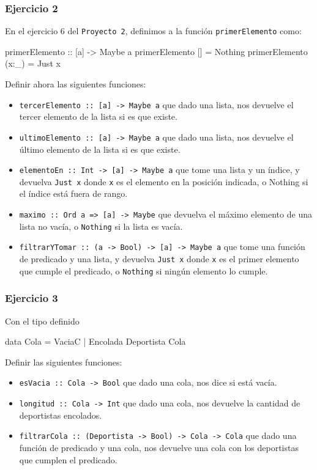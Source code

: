 \documentclass{article}
\begin{document}
\subsubsection{Ejercicio 2}
En el ejercicio 6 del \texttt{Proyecto 2}, definimos a la función \texttt{primerElemento} como:
\begin{haskell}
primerElemento :: [a] -> Maybe a
primerElemento [] = Nothing
primerElemento (x:_) = Just x
\end{haskell}
Definir ahora las siguientes funciones:
\begin{itemize}
    \item \texttt{tercerElemento :: [a] -> Maybe a} que dado una lista, nos devuelve el tercer elemento de la lista si es que existe.
    \item \texttt{ultimoElemento :: [a] -> Maybe a} que dado una lista, nos devuelve el último elemento de la lista si es que existe.
    \item \texttt{elementoEn :: Int -> [a] -> Maybe a} que tome una lista y un índice, y devuelva \texttt{Just x} donde \texttt{x} es el elemento en la posición indicada, o Nothing si el índice está fuera de rango.
    \item \texttt{maximo :: Ord a => [a] -> Maybe} que devuelva el máximo elemento de una lista no vacía, o \texttt{Nothing} si la lista es vacía.
    \item \texttt{filtrarYTomar :: (a -> Bool) -> [a] -> Maybe a} que tome una función de predicado y una lista, y devuelva \texttt{Just x} donde \texttt{x} es el primer elemento que cumple el predicado, o \texttt{Nothing} si ningún elemento lo cumple.
\end{itemize}

\subsubsection{Ejercicio 3}
Con el tipo definido 
\begin{haskell}
data Cola = VaciaC | Encolada Deportista Cola
\end{haskell}
Definir las siguientes funciones:
\begin{itemize}
    \item \texttt{esVacia :: Cola -> Bool} que dado una cola, nos dice si está vacía.
    \item \texttt{longitud :: Cola -> Int} que dado una cola, nos devuelve la cantidad de deportistas encolados.
    \item \texttt{filtrarCola :: (Deportista -> Bool) -> Cola -> Cola} que dado una función de predicado y una cola, nos devuelve una cola con los deportistas que cumplen el predicado.
\end{itemize}
\end{document}
